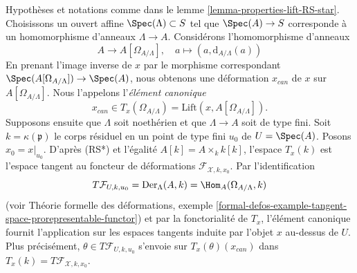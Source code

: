 \begin{remark}
\label{remark-canonical-element}
Hypothèses et notations comme dans le lemme \ref{lemma-properties-lift-RS-star}.
Choisissons un ouvert affine $\Spec(\Lambda) \subset S$ tel que $\Spec(A) \to S$
corresponde à un homomorphisme d'anneaux $\Lambda \to A$. Considérons l'homomorphisme d'anneaux
$$
A \longrightarrow A[\Omega_{A/\Lambda}],
\quad
a \longmapsto (a, \text{d}_{A/\Lambda}(a))
$$
En prenant l'image inverse de $x$ par le morphisme correspondant
$\Spec(A[\Omega_{A/\Lambda}]) \to \Spec(A)$, nous obtenons une
déformation $x_{can}$ de $x$ sur $A[\Omega_{A/\Lambda}]$. Nous l'appelons
l'{\it élément canonique}
$$
x_{can} \in T_x(\Omega_{A/\Lambda}) = \text{Lift}(x, A[\Omega_{A/\Lambda}]).
$$
Supposons ensuite que $\Lambda$ soit noethérien et que $\Lambda \to A$
soit de type fini. Soit
$k = \kappa(\mathfrak p)$ le corps résiduel en un point de type fini $u_0$
de $U = \Spec(A)$. Posons $x_0 = x|_{u_0}$. D'après (RS*) et l'égalité
$A[k] = A \times_k k[k]$, l'espace $T_x(k)$ est l'espace tangent au
foncteur de déformations $\mathcal{F}_{\mathcal{X}, k, x_0}$. Par l'identification
$$
T\mathcal{F}_{U, k, u_0} =
\text{Der}_\Lambda(A, k) = \Hom_A(\Omega_{A/\Lambda}, k)
$$
(voir Théorie formelle des déformations, exemple
\ref{formal-defos-example-tangent-space-prorepresentable-functor})
et par la fonctorialité de $T_x$, l'élément canonique fournit l'application
sur les espaces tangents induite par l'objet $x$ au-dessus de $U$. Plus précisément,
$\theta \in T\mathcal{F}_{U, k, u_0}$ s'envoie sur $T_x(\theta)(x_{can})$
dans $T_x(k) = T\mathcal{F}_{\mathcal{X}, k, x_0}$.
\end{remark}

